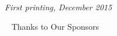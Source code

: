 \documentclass[11pt,fleqn]{book} %
\begin{document}
\noindent \textit{First printing, December 2015} %


\newpage
~\vfill
\thispagestyle{empty}
\Huge  Thanks to Our Sponsors\\  
\large



\pagestyle{empty} %

\tableofcontents %

\cleardoublepage %

\pagestyle{fancy} %

\part{}






\end{document}
